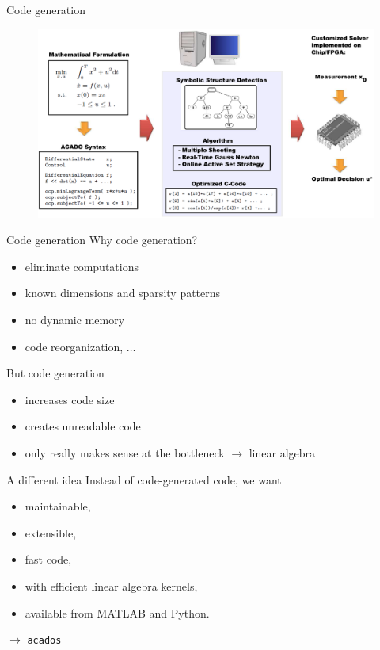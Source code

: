 \documentclass[10pt]{beamer}
\begin{document}
\begin{frame}{Code generation}
	\begin{figure}
		\centering
		\includegraphics[width=0.8\linewidth]{AcadoCodeGen}
		\label{fig:acadocodegen}
	\end{figure}
	\pause
	\centering \huge {}
\end{frame}

\begin{frame}{Code generation}
	Why code generation?
	\begin{itemize}
		\item eliminate computations 
		\item known dimensions and sparsity patterns 
		\item no dynamic memory
		\item code reorganization, $\ldots$
	\end{itemize}
	\pause
	But code generation
	\begin{itemize}
		\item increases code size
		\item creates unreadable code
		\item only really makes sense at the bottleneck $\rightarrow$ linear algebra
	\end{itemize}
\end{frame}

\begin{frame}{A different idea}
	Instead of code-generated code, we want
	\begin{itemize}
		\item maintainable, 
		\item extensible,
		\item fast code,
		\item with efficient linear algebra kernels,
		\item available from \textsc{MATLAB} and Python.
	\end{itemize}
	\centering \huge $\rightarrow$ \texttt{acados}
\end{frame}
\end{document}
